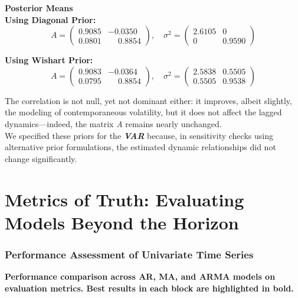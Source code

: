\documentclass{Configuration_Files/PoliMi3i_thesis}
\begin{document}
\textbf{Posterior Means}\\

\textbf{Using Diagonal Prior:}
\[
A =
\begin{pmatrix}
0.9085 & -0.0350 \\
0.0801 & \phantom{-}0.8854
\end{pmatrix}, \quad
\sigma^2 =
\begin{pmatrix}
2.6105 & 0 \\
0 & 0.9590
\end{pmatrix}
\]

\textbf{Using Wishart Prior:}
\[
A =
\begin{pmatrix}
0.9083 & -0.0364 \\
0.0795 & \phantom{-}0.8854
\end{pmatrix}, \quad
\sigma^2 =
\begin{pmatrix}
2.5838 & 0.5505 \\
0.5505 & 0.9538
\end{pmatrix}
\]

The correlation is not null, yet not dominant either: it improves, albeit slightly, the modeling of contemporaneous volatility, but it does not affect the lagged dynamics—indeed, the matrix \textit{A} remains nearly unchanged.\\

We specified these priors for the \textbf{\textit{VAR}} because, in sensitivity checks using alternative prior formulations, the estimated dynamic relationships did not change significantly.

\chapter{Metrics of Truth: Evaluating Models Beyond the Horizon}
\subsection{Performance Assessment of Univariate Time Series}
\textbf{Performance comparison across AR, MA, and ARMA models on evaluation metrics. Best results in each block are highlighted in bold.}
\end{document}
